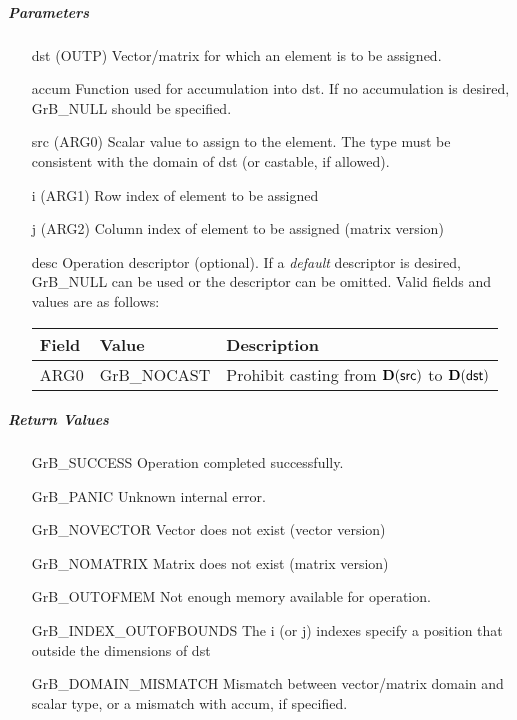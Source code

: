 \subparagraph{Parameters}

\begin{itemize}[leftmargin=1.1in]
    \item[{\sf dst}]   ({\sf OUTP}) Vector/matrix for which an element is to be assigned.

    \item[{\sf accum}] Function used for accumulation into {\sf dst}.  If no accumulation
                        is desired, {\sf GrB\_NULL} should be specified.

    \item[{\sf src}]   ({\sf ARG0}) Scalar value to assign to the element.  The type must
                              be consistent with the domain of dst (or castable, if allowed).
    \item[{\sf i}]     ({\sf ARG1}) Row index of element to be assigned
    \item[{\sf j}]     ({\sf ARG2}) Column index of element to be assigned (matrix version)

    \item[{\sf desc}]   Operation descriptor (optional). If a
    \emph{default} descriptor is desired, {\sf GrB\_NULL} can be
    used or the descriptor can be omitted.  Valid fields and values are as follows: \\
    \begin{tabular}{lll}
    Field  & Value & Description \\
    \hline
    {\sf ARG0} & {\sf GrB\_NOCAST} & Prohibit casting from $\bold{D}({\sf src})$ to $\bold{D}({\sf dst})$ \\
    \end{tabular}

\end{itemize}

\subparagraph{Return Values}

\begin{itemize}[leftmargin=2.1in]
\item[{\sf GrB\_SUCCESS}]             Operation completed successfully.
\item[{\sf GrB\_PANIC}]               Unknown internal error.
\item[{\sf GrB\_NOVECTOR}]            Vector does not exist (vector version)
\item[{\sf GrB\_NOMATRIX}]            Matrix does not exist (matrix version)
\item[{\sf GrB\_OUTOFMEM}]            Not enough memory available for operation.
\item[{\sf GrB\_INDEX\_OUTOFBOUNDS}]  The i (or j) indexes specify a position that outside the dimensions of dst
\item[{\sf GrB\_DOMAIN\_MISMATCH}]    Mismatch between vector/matrix domain and scalar type,
                                      or a mismatch with {\sf accum}, if specified.
\end{itemize}

